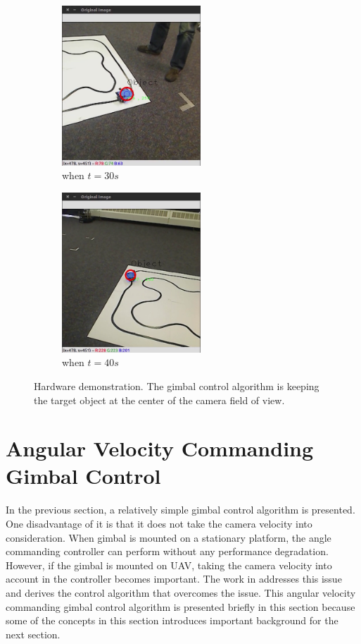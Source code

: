 \begin{figure}[htbp]
\begin{subfigure}{0.5\textwidth}
		\centering
		\includegraphics[height=6cm]{images/chapter2/gimbal_30s.png}
		\caption{when $t=30s$}
	\end{subfigure}
	\begin{subfigure}{0.5\textwidth}
		\centering
		\includegraphics[height=6cm]{images/chapter2/gimbal_40s.png}
		\caption{when $t=40s$}
	\end{subfigure}	
	\caption{Hardware demonstration. The gimbal control algorithm is keeping the target object at the center of the camera field of view.}
	\label{gimbal_result}
\end{figure}


\section{Angular Velocity Commanding Gimbal Control}
In the previous section, a relatively simple gimbal control algorithm is presented. One disadvantage of it is that it does not take the camera velocity into consideration. When gimbal is mounted on a stationary platform, the angle commanding controller can perform without any performance degradation. However, if the gimbal is mounted on UAV, taking the camera velocity into account in the controller becomes important. The work in \cite{Hurak2012} addresses this issue and derives the control algorithm that overcomes the issue. This angular velocity commanding gimbal control algorithm is presented briefly in this section because some of the concepts in this section introduces important background for the next section. 

